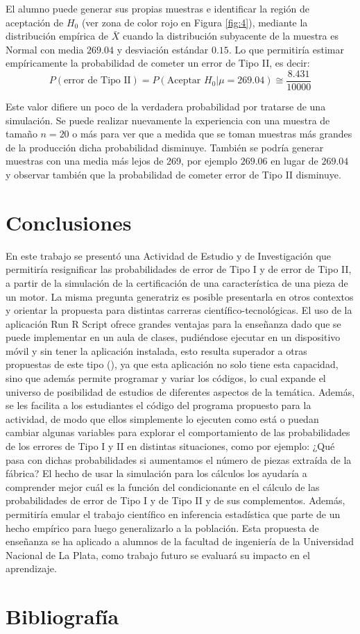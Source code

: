 \documentclass[oneside,spanish]{amsart}
\numberwithin{equation}{section}
\theoremstyle{definition}
\begin{document}
El alumno puede generar sus propias muestras e identificar la región de aceptación de $H_0$ (ver zona de color rojo en Figura \ref{fig:4}), mediante la distribución empírica de $\bar{X}$ cuando la distribución subyacente de la muestra es Normal con media $269.04$ y desviación estándar $0.15$. Lo que permitiría estimar empíricamente la probabilidad de cometer un error de Tipo II, es decir:
\begin{equation*}
	P(\text{error de Tipo II}) = P(\text{Aceptar $H_0$}|\mu=269.04) \cong \frac{8.431}{10000}
\end{equation*}

Este valor difiere un poco de la verdadera probabilidad por tratarse de una simulación. Se puede realizar nuevamente la experiencia con una muestra de tamaño $n=20$ o más para ver que a medida que se toman muestras más grandes de la producción dicha probabilidad disminuye. También se podría generar muestras con una media más lejos de 269, por ejemplo $269.06$ en lugar de $269.04$ y observar también que la probabilidad de cometer error de Tipo II disminuye.

\section{Conclusiones}

En este trabajo se presentó una Actividad de Estudio y de Investigación que permitiría resignificar las probabilidades de error de Tipo I y de error de Tipo II, a partir de la simulación de la certificación de una característica de una pieza de un motor. La misma pregunta generatriz es posible presentarla en otros contextos y orientar la propuesta para distintas carreras científico-tecnológicas. El uso de la aplicación Run R Script ofrece grandes ventajas para la enseñanza dado que se puede implementar en un aula de clases, pudiéndose ejecutar en un dispositivo móvil y sin tener la aplicación instalada, esto resulta superador a otras propuestas de este tipo (\citet{batanero15}), ya que esta aplicación no solo tiene esta capacidad, sino que además permite programar y variar los códigos, lo cual expande el universo de posibilidad de estudios de diferentes aspectos de la temática. Además, se les facilita a los estudiantes el código del programa propuesto para la actividad, de modo que ellos simplemente lo ejecuten como está o puedan cambiar algunas variables para explorar el comportamiento de las probabilidades de los errores de Tipo I y II en distintas situaciones, como por ejemplo: ¿Qué pasa con dichas probabilidades si aumentamos el número de piezas extraída de la fábrica? El hecho de usar la simulación para los cálculos los ayudaría a comprender mejor cuál es la función del condicionante en el cálculo de las probabilidades de error de Tipo I y de Tipo II y de sus complementos. Además, permitiría emular el trabajo científico en inferencia estadística que parte de un hecho empírico para luego generalizarlo a la población. Esta propuesta de enseñanza se ha aplicado a alumnos de la facultad de ingeniería de la Universidad Nacional de La Plata, como trabajo futuro se evaluará su impacto en el aprendizaje.

\section{Bibliografía}

\nocite{*}
\printbibliography
\end{document}
